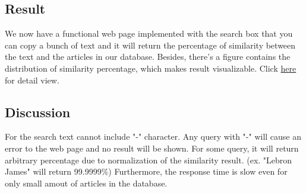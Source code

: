 \subsection{Result}
We now have a functional web page implemented with the search box that you can copy a bunch of text and it will return the percentage of similarity between the text and the articles in our database.
Besides, there's a figure contains the distribution of similarity percentage, which makes result visualizable. 
Click \href{http://django.nordlinglab.org}{here} for detail view.

\subsection{Discussion}
For the search text cannot include "-" character. Any query with "-" will cause an error to the web page and no result will be shown. For some query, it will return arbitrary percentage due to normalization of the similarity result. (ex. "Lebron James" will return 99.9999\%)
Furthermore, the response time is slow even for only small amout of articles in the database.